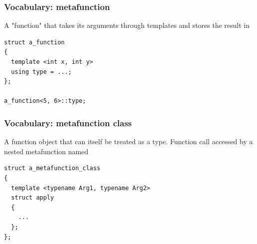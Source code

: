 \documentclass[14pt]{beamer}
\begin{document}
\begin{frame}[fragile]
  \frametitle{Vocabulary: metafunction}

  A "function" that takes its arguments through templates and stores the result
  in 

  \vspace{.5cm}

  \begin{lstlisting}[basicstyle=\codefontsize{12pt}]
struct a_function
{
  template <int x, int y>
  using type = ...;
};

a_function<5, 6>::type;
  \end{lstlisting}

\end{frame}

\begin{frame}[fragile]
  \frametitle{Vocabulary: metafunction class}

  A function object that can itself be treated as a type. Function call accessed
  by a nested metafunction named 

  \vspace{.25cm}

  \begin{lstlisting}[basicstyle=\codefontsize{12pt}]
struct a_metafunction_class
{
  template <typename Arg1, typename Arg2>
  struct apply
  {
    ...
  };
};
  \end{lstlisting}

\end{frame}
\end{document}
